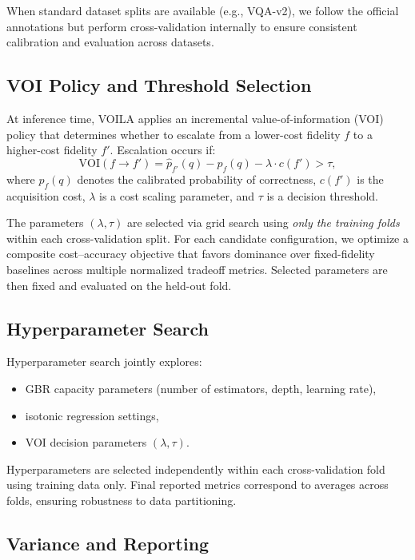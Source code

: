 When standard dataset splits are available (e.g., VQA-v2), we follow the official annotations but perform cross-validation internally to ensure consistent calibration and evaluation across datasets.

\subsection{VOI Policy and Threshold Selection}
\label{sec:voi_policy}

At inference time, \textsc{VOILA} applies an incremental value-of-information (VOI) policy that determines whether to escalate from a lower-cost fidelity $f$ to a higher-cost fidelity $f'$.
Escalation occurs if:
\[
\mathrm{VOI}(f \rightarrow f') = \hat{p}_{f'}(q) - \hat{p}_{f}(q) - \lambda \cdot c(f') > \tau,
\]
where $\hat{p}_f(q)$ denotes the calibrated probability of correctness, $c(f')$ is the acquisition cost, $\lambda$ is a cost scaling parameter, and $\tau$ is a decision threshold.

The parameters $(\lambda, \tau)$ are selected via grid search using \emph{only the training folds} within each cross-validation split.
For each candidate configuration, we optimize a composite cost--accuracy objective that favors dominance over fixed-fidelity baselines across multiple normalized tradeoff metrics.
Selected parameters are then fixed and evaluated on the held-out fold.

\subsection{Hyperparameter Search}
\label{sec:hyperparam_search}

Hyperparameter search jointly explores:
\begin{itemize}
    \item GBR capacity parameters (number of estimators, depth, learning rate),
    \item isotonic regression settings,
    \item VOI decision parameters $(\lambda, \tau)$.
\end{itemize}

Hyperparameters are selected independently within each cross-validation fold using training data only.
Final reported metrics correspond to averages across folds, ensuring robustness to data partitioning.

\subsection{Variance and Reporting}
\label{sec:variance}

